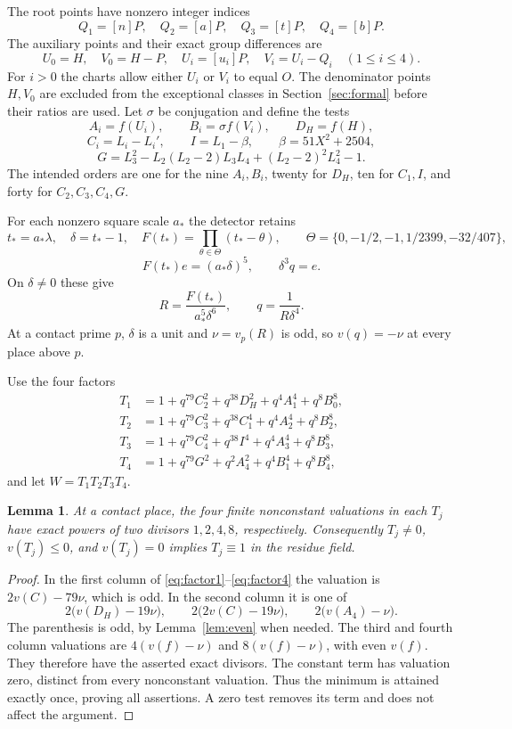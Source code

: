 \documentclass[11pt,a4paper]{article}
\newtheorem{lemma}[theorem]{Lemma}
\theoremstyle{remark}\newtheorem{remark}[theorem]{Remark}
\begin{document}
The root points have nonzero integer indices
\[
 Q_1=[n]P,\quad Q_2=[a]P,\quad Q_3=[t]P,\quad Q_4=[b]P.
\]
The auxiliary points and their exact group differences are
\[
 U_0=H,\quad V_0=H-P,\quad U_i=[u_i]P,\quad
 V_i=U_i-Q_i\quad(1\le i\le4).
\]
For $i>0$ the charts allow either $U_i$ or $V_i$ to equal $O$.
The denominator points $H,V_0$ are excluded from the exceptional
classes in Section~\ref{sec:formal} before their ratios are used.
Let $\sigma$ be conjugation and define the tests
\[
 A_i=f(U_i),\qquad B_i=\sigma f(V_i),\qquad D_H=f(H),
\]
\[
 C_i=L_i-L_i',\qquad I=L_1-\beta,\qquad \beta=51X^2+2504,
\]
\[
 G=L_3^2-L_2(L_2-2)L_3L_4+(L_2-2)^2L_4^2-1.
\]
The intended orders are one for the nine $A_i,B_i$, twenty for
$D_H$, ten for $C_1,I$, and forty for $C_2,C_3,C_4,G$.

For each nonzero square scale $a_*$ the detector retains
\[
 t_*=a_*\lambda,\quad \delta=t_*-1,\quad
 F(t_*)=\prod_{\theta\in\Theta}(t_*-\theta),\qquad
 \Theta=\{0,-1/2,-1,1/2399,-32/407\},
\]
\begin{equation}\label{eq:clearedweights}
 F(t_*)e=(a_*\delta)^5,\qquad \delta^3q=e.
\end{equation}
On $\delta\ne0$ these give
\[
 R=\frac{F(t_*)}{a_*^5\delta^6},\qquad q=\frac1{R\delta^4}.
\]
At a contact prime $p$, $\delta$ is a unit and $\nu=v_p(R)$ is odd,
so $v(q)=-\nu$ at every place above $p$.

Use the four factors
\begin{align}
 T_1&=1+q^{79}C_2^2+q^{38}D_H^2+q^4A_1^4+q^8B_0^8,
       \label{eq:factor1}\\
 T_2&=1+q^{79}C_3^2+q^{38}C_1^4+q^4A_2^4+q^8B_2^8,
       \label{eq:factor2}\\
 T_3&=1+q^{79}C_4^2+q^{38}I^4+q^4A_3^4+q^8B_3^8,
       \label{eq:factor3}\\
 T_4&=1+q^{79}G^2+q^2A_4^2+q^4B_1^4+q^8B_4^8,
       \label{eq:factor4}
\end{align}
and let $W=T_1T_2T_3T_4$.

\begin{lemma}\label{lem:classes}
At a contact place, the four finite nonconstant valuations in each
$T_j$ have exact powers of two divisors $1,2,4,8$, respectively.
Consequently $T_j\ne0$, $v(T_j)\le0$, and $v(T_j)=0$ implies
$T_j\equiv1$ in the residue field.
\end{lemma}
\begin{proof}
In the first column of \eqref{eq:factor1}--\eqref{eq:factor4} the
valuation is $2v(C)-79\nu$, which is odd. In the second column it is
one of
\[
 2\bigl(v(D_H)-19\nu\bigr),\qquad
 2\bigl(2v(C)-19\nu\bigr),\qquad
 2\bigl(v(A_4)-\nu\bigr).
\]
The parenthesis is odd, by Lemma~\ref{lem:even} when needed.
The third and fourth column valuations are
$4(v(f)-\nu)$ and $8(v(f)-\nu)$, with even $v(f)$.
They therefore have the asserted exact divisors. The constant term
has valuation zero, distinct from every nonconstant valuation.
Thus the minimum is attained exactly once, proving all assertions.
A zero test removes its term and does not affect the argument.
\end{proof}
\end{document}
